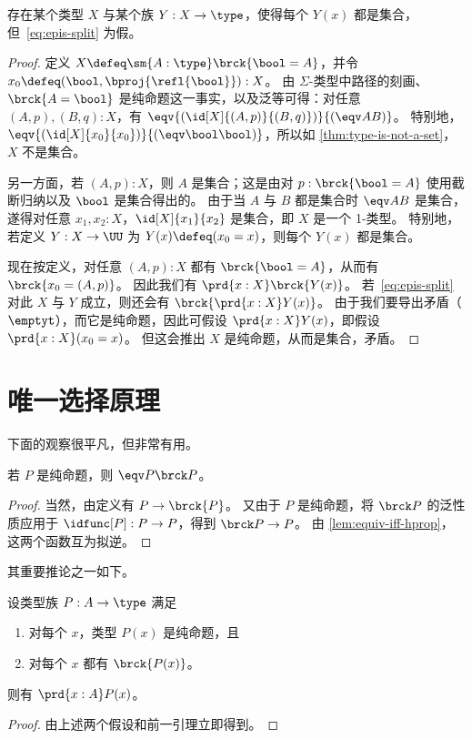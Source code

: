 \begin{lem}\label{thm:no-higher-ac}
  存在某个类型 $X$ 与某个族 $Y:X\to \type$，使得每个 $Y(x)$ 都是集合，但~\eqref{eq:epis-split} 为假。
\end{lem}
\begin{proof}
  定义 $X\defeq \sm{A:\type} \brck{\bool = A}$，并令 $x_0 \defeq (\bool, \bproj{\refl{\bool}}) : X$。
  由 $\Sigma$-类型中路径的刻画、$\brck{A=\bool}$ 是纯命题这一事实，以及泛等可得：对任意 $(A,p),(B,q):X$，有 $\eqv{(\id[X]{(A,p)}{(B,q)})}{(\eqv AB)}$。
  特别地，$\eqv{(\id[X]{x_0}{x_0})}{(\eqv \bool\bool)}$，所以如 \cref{thm:type-is-not-a-set}，$X$ 不是集合。

  另一方面，若 $(A,p):X$，则 $A$ 是集合；这是由对 $p:\brck{\bool=A}$ 使用截断归纳以及 $\bool$ 是集合得出的。
  由于当 $A$ 与 $B$ 都是集合时 $\eqv A B$ 是集合，遂得对任意 $x_1,x_2:X$，$\id[X]{x_1}{x_2}$ 是集合，即 $X$ 是一个 1-类型。
  特别地，若定义 $Y:X\to\UU$ 为 $Y(x) \defeq (x_0=x)$，则每个 $Y(x)$ 都是集合。

  现在按定义，对任意 $(A,p):X$ 都有 $\brck{\bool=A}$，从而有 $\brck{x_0 = (A,p)}$。
  因此我们有 $\prd{x:X} \brck{Y(x)}$。
  若~\eqref{eq:epis-split} 对此 $X$ 与 $Y$ 成立，则还会有 $\brck{\prd{x:X} Y(x)}$。
  由于我们要导出矛盾（$\emptyt$），而它是纯命题，因此可假设 $\prd{x:X} Y(x)$，即假设 $\prd{x:X} (x_0=x)$。
  但这会推出 $X$ 是纯命题，从而是集合，矛盾。
\end{proof}

%
%

\section{唯一选择原理}
\label{sec:unique-choice}

%
%

下面的观察很平凡，但非常有用。

\begin{lem}\label{thm:prop-equiv-trunc}
  若 $P$ 是纯命题，则 $\eqv P {\brck P}$。
\end{lem}
\begin{proof}
  当然，由定义有 $P\to \brck{P}$。
  又由于 $P$ 是纯命题，将 $\brck P$ 的泛性质应用于 $\idfunc[P] :P\to P$，得到 $\brck P \to P$。
  由 \cref{lem:equiv-iff-hprop}，这两个函数互为拟逆。
\end{proof}

其重要推论之一如下。

\begin{cor}[唯一选择原理]\label{cor:UC}
  设类型族 $P:A\to \type$ 满足
  \begin{enumerate}
  \item 对每个 $x$，类型 $P(x)$ 是纯命题，且
  \item 对每个 $x$ 都有 $\brck {P(x)}$。
  \end{enumerate}
  则有 $\prd{x:A} P(x)$。
\end{cor}
\begin{proof}
  由上述两个假设和前一引理立即得到。
\end{proof}

